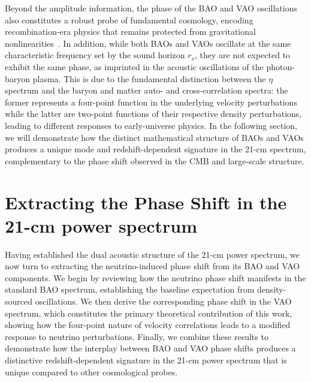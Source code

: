 Beyond the amplitude information, the phase of the BAO and VAO oscillations also constitutes a robust probe of fundamental cosmology, encoding recombination-era physics that remains protected from gravitational nonlinearities~\cite{Pan:2016zla,Baumann:2017lmt,Green:2020fjb}. In addition, while both BAOs and VAOs oscillate at the same characteristic frequency set by the sound horizon $r_s$, they are not expected to exhibit the same phase, as imprinted in the acoustic oscillations of the photon-baryon plasma. This is due to the fundamental distinction between the $\eta$ spectrum and the baryon and matter auto- and cross-correlation spectra: the former represents a four-point function in the underlying velocity perturbations while the latter are two-point functions of their respective density perturbations, leading to different responses to early-universe physics. In the following section, we will demonstrate how the distinct mathematical structure of BAOs and VAOs produces a unique mode and redshift-dependent signature in the 21-cm spectrum, complementary to the phase shift observed in the CMB and large-scale structure.



\section{Extracting the Phase Shift in the 21-cm power spectrum}\label{sec:ch14-phase_21cm}


Having established the dual acoustic structure of the 21-cm power spectrum, we now turn to extracting the neutrino-induced phase shift from its BAO and VAO components. We begin by reviewing how the neutrino phase shift manifests in the standard BAO spectrum, establishing the baseline expectation from density-sourced oscillations. We then derive the corresponding phase shift in the VAO spectrum, which constitutes the primary theoretical contribution of this work, showing how the four-point nature of velocity correlations leads to a modified response to neutrino perturbations. Finally, we combine these results to demonstrate how the interplay between BAO and VAO phase shifts produces a distinctive redshift-dependent signature in the 21-cm power spectrum that is unique compared to other cosmological probes.

